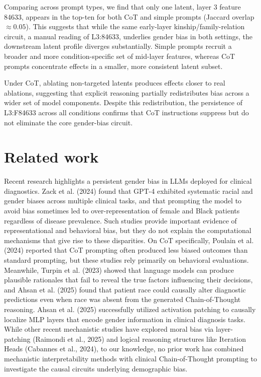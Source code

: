 \documentclass{article}
\begin{document}

Comparing across prompt types, we find that only one latent, layer 3 feature 84633, appears in the top-ten for both CoT and simple prompts (Jaccard overlap $\approx 0.05$). This suggests that while the same early-layer kinship/family-relation circuit, a manual reading of L3:84633, underlies gender bias in both settings, the downstream latent profile diverges substantially. Simple prompts recruit a broader and more condition-specific set of mid-layer features, whereas CoT prompts concentrate effects in a smaller, more consistent latent subset.

Under CoT, ablating non-targeted latents produces effects closer to real ablations, suggesting that explicit reasoning partially redistributes bias across a wider set of model components. Despite this redistribution, the persistence of L3:F84633 across all conditions confirms that CoT instructions suppress but do not eliminate the core gender-bias circuit.

\section{Related work}

Recent research highlights a persistent gender bias in LLMs deployed for clinical diagnostics. Zack et al. (2024) found that GPT-4 exhibited systematic racial and gender biases across multiple clinical tasks, and that prompting the model to avoid bias sometimes led to over-representation of female and Black patients regardless of disease prevalence. Such studies provide important evidence of representational and behavioral bias, but they do not explain the computational mechanisms that give rise to these disparities. On CoT specifically, Poulain et al. (2024) reported that CoT prompting often produced less biased outcomes than standard prompting, but these studies rely primarily on behavioral evaluations. Meanwhile, Turpin et al. (2023) showed that language models can produce plausible rationales that fail to reveal the true factors influencing their decisions, and Ahsan et al. (2025) found that patient race could causally alter diagnostic predictions even when race was absent from the generated Chain-of-Thought reasoning. Ahsan et al. (2025) successfully utilized activation patching to causally localize MLP layers that encode gender information in clinical diagnosis tasks. While other recent mechanistic studies have explored moral bias via layer-patching (Raimondi et al., 2025) and logical reasoning structures like Iteration Heads (Cabannes et al., 2024), to our knowledge, no prior work has combined mechanistic interpretability methods with clinical Chain-of-Thought prompting to investigate the causal circuits underlying demographic bias. 
\end{document}
